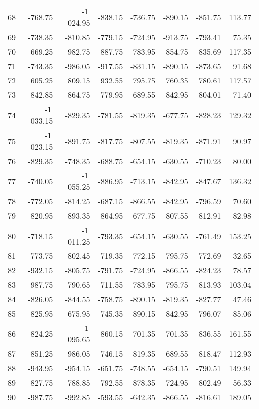 \begin{longtable}{rrrrrrrr}
68 & -768.75 & -1\,024.95 & -838.15 & -736.75 & -890.15 & -851.75 & 113.77  \\
69 & -738.35 & -810.85 & -779.15 & -724.95 & -913.75 & -793.41 & 75.35  \\
70 & -669.25 & -982.75 & -887.75 & -783.95 & -854.75 & -835.69 & 117.35  \\
71 & -743.35 & -986.05 & -917.55 & -831.15 & -890.15 & -873.65 & 91.68  \\
72 & -605.25 & -809.15 & -932.55 & -795.75 & -760.35 & -780.61 & 117.57  \\
73 & -842.85 & -864.75 & -779.95 & -689.55 & -842.95 & -804.01 & 71.40  \\
74 & -1\,033.15 & -829.35 & -781.55 & -819.35 & -677.75 & -828.23 & 129.32  \\
75 & -1\,023.15 & -891.75 & -817.75 & -807.55 & -819.35 & -871.91 & 90.97  \\
76 & -829.35 & -748.35 & -688.75 & -654.15 & -630.55 & -710.23 & 80.00  \\
77 & -740.05 & -1\,055.25 & -886.95 & -713.15 & -842.95 & -847.67 & 136.32  \\
78 & -772.05 & -814.25 & -687.15 & -866.55 & -842.95 & -796.59 & 70.60  \\
79 & -820.95 & -893.35 & -864.95 & -677.75 & -807.55 & -812.91 & 82.98  \\
80 & -718.15 & -1\,011.25 & -793.35 & -654.15 & -630.55 & -761.49 & 153.25  \\
81 & -773.75 & -802.45 & -719.35 & -772.15 & -795.75 & -772.69 & 32.65  \\
82 & -932.15 & -805.75 & -791.75 & -724.95 & -866.55 & -824.23 & 78.57  \\
83 & -987.75 & -790.65 & -711.55 & -783.95 & -795.75 & -813.93 & 103.04  \\
84 & -826.05 & -844.55 & -758.75 & -890.15 & -819.35 & -827.77 & 47.46  \\
85 & -825.95 & -675.95 & -745.35 & -890.15 & -842.95 & -796.07 & 85.06  \\
86 & -824.25 & -1\,095.65 & -860.15 & -701.35 & -701.35 & -836.55 & 161.55  \\
87 & -851.25 & -986.05 & -746.15 & -819.35 & -689.55 & -818.47 & 112.93  \\
88 & -943.95 & -954.15 & -651.75 & -748.55 & -654.15 & -790.51 & 149.94  \\
89 & -827.75 & -788.85 & -792.55 & -878.35 & -724.95 & -802.49 & 56.33  \\
90 & -987.75 & -992.85 & -593.55 & -642.35 & -866.55 & -816.61 & 189.05  \\

\end{longtable}

